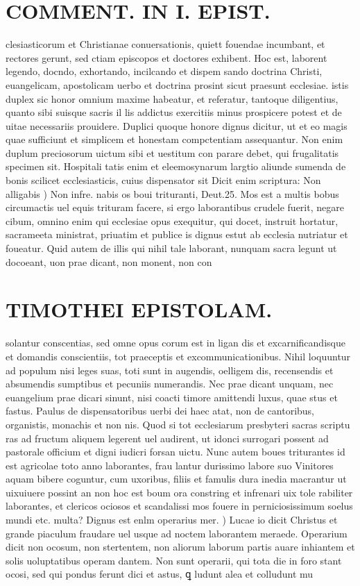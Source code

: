 \documentclass{article}
\begin{document}
\begin{pages}
\section*{COMMENT. IN I. EPIST. }
\marginpar{[ p.138 ]}\pstart clesiasticorum et Christianae conuersationis, quiett fouendae incumbant, et rectores gerunt, sed ctiam episcopos et doctores exhibent. Hoc est, laborent legendo, docndo, exhortando, incilcando et dispem sando doctrina Christi, euangelicam, apostolicam uerbo et doctrina prosint sicut praesunt ecclesiae. istis duplex sic honor omnium maxime habeatur, et referatur, tantoque diligentius, quanto sibi suisque sacris il lis addictus exercitiis minus prospicere potest et de uitae necessariis prouidere. Duplici quoque honore dignus dicitur, ut et eo magis quae sufficiunt et simplicem et honestam compctentiam assequantur. Non enim duplum preciosorum uictum sibi et uestitum con parare debet, qui frugalitatis specimen sit. Hospitali tatis enim et eleemosynarum largtio aliunde sumenda de bonis scilicet ecclesiasticis, cuius dispensator sit  \pend\pstart Dicit enim scriptura: Non alligabis ) Non infre. nabis os boui trituranti, Deut.25. Mos est a multis bobus circumactis uel equis trituram facere, si ergo laborantibus crudele fuerit, negare cibum, omnino enim qui ecclesiae opus exequitur, qui docet, instruit hortatur, sacrameeta ministrat, priuatim et publice is dignus estut ab ecclesia nutriatur et foueatur. Quid autem de illis qui nihil tale laborant, nunquam sacra legunt ut docoeant, uon prae dicant, non monent, non con  \pend
\section*{TIMOTHEI EPISTOLAM. }
\marginpar{[ p.139 ]}\pstart solantur conscentias, sed omne opus corum est in ligan dis et excarnificandisque et domandis conscientiis, tot praeceptis et excommunicationibus. Nihil loquuntur ad populum nisi leges suas, toti sunt in augendis, oelligem dis, recensendis et absumendis sumptibus et pecuniis numerandis. Nec prae dicant unquam, nec euangelium prae dicari sinunt, nisi coacti timore amittendi luxus, quae stus et fastus. Paulus de dispensatoribus uerbi dei haec atat, non de cantoribus, organistis, monachis et non nis. Quod si tot ecclesiarum presbyteri sacras scriptu ras ad fructum aliquem legerent uel audirent, ut idonci surrogari possent ad pastorale officium et digni iudicri forsan uictu. Nunc autem boues triturantes id est agricolae toto anno laborantes, frau lantur durissimo labore suo Vinitores aquam bibere coguntur, cum uxoribus, filiis et famulis dura inedia macrantur ut uixuiuere possint an non hoc est boum ora constring et infrenari uix tole rabiliter laborantes, et clericos ociosos et scandalissi mos fouere in perniciosissimum soelus mundi etc. multa?  \pend\pstart Dignus est enlm operarius mer. ) Lucae io dicit Christus et grande piaculum fraudare uel usque ad noctem laborantem meraede. Operarium dicit non ocosum, non stertentem, non aliorum laborum partis auare inhiantem et solis uoluptatibus operam dantem. Non sunt operarii, qui tota die in foro stant ocosi, sed qui pondus ferunt dici et astus, ꝗ ludunt alea et colludunt mu  \pend

\end{pages}
\end{document}
